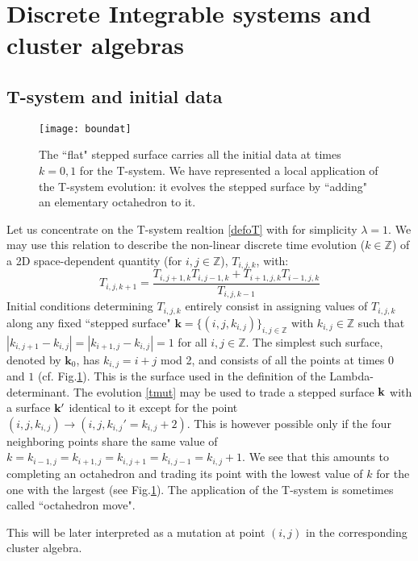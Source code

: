 \documentclass[12pt]{amsart}
\numberwithin{equation}{section}
\begin{document}
\section{Discrete Integrable systems and cluster algebras}

\subsection{T-system and initial data}

\begin{figure}
\centering
\texttt{[image: boundat]}
\caption{\small The ``flat" stepped surface carries all the initial data at times $k=0,1$ for the T-system.
We have represented a local application of the T-system evolution: it evolves the stepped surface by ``adding"
an elementary octahedron to it.}
\label{fig:boundat}
\end{figure}

Let us concentrate on the T-system realtion \eqref{defoT} with for simplicity $\lambda=1$.
We may use this relation to describe the non-linear discrete time evolution ($k\in {{\mathbb Z}}$) of a 2D space-dependent
quantity (for $i,j\in {{\mathbb Z}}$), $T_{i,j,k}$, with:
\begin{equation}\label{tmut}
T_{i,j,k+1}=\frac{T_{i,j+1,k}T_{i,j-1,k}+ T_{i+1,j,k}T_{i-1,j,k}}{T_{i,j,k-1}}
\end{equation}
Initial conditions determining $T_{i,j,k}$ entirely consist in assigning values of $T_{i,j,k}$ along any fixed
``stepped surface" ${\mathbf k}=\{(i,j,k_{i,j})\}_{i,j\in {{\mathbb Z}}}$ with $k_{i,j}\in {{\mathbb Z}}$
such that $|k_{i,j+1}-k_{i,j}|=|k_{i+1,j}-k_{i,j}|=1$ for all $i,j\in {{\mathbb Z}}$.
The simplest such surface, denoted by ${\mathbf k}_0$, has $k_{i,j}=i+j$
mod 2, and consists of all the points at times $0$ and $1$ (cf. Fig.\ref{fig:boundat}).
This is the surface used in the definition of the Lambda-determinant.
The evolution \eqref{tmut} may be used to trade a stepped surface $\bf k$ with 
a surface $\bf k'$ identical to it except for the point $(i,j,k_{i,j})\to (i,j,k_{i,j}'=k_{i,j}+2)$. This is however possible only if
the four neighboring points share the same value of $k=k_{i-1,j}=k_{i+1,j}=k_{i,j+1}=k_{i,j-1}=k_{i,j}+1$.
We see that this amounts to completing an octahedron and trading its point with 
the lowest value of $k$ for the one with the largest
(see Fig.\ref{fig:boundat}). The  application of the T-system is sometimes called ``octahedron move".

This will be later interpreted
as a mutation at point $(i,j)$ in the corresponding cluster algebra. 
\end{document}
